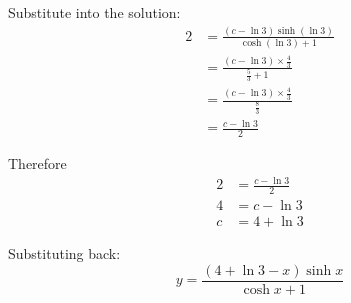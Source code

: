 \documentclass[leqno]{article}
\begin{document}
\begin{enumerate}[
  label=\textbf{\arabic*.},
  leftmargin=*,
  topsep=0pt,
  partopsep=0pt,
  parsep=0pt
]
\begin{djsSolution}
\begin{enumerate}[label=\textbf{(\alph*)}]
Substitute into the solution:
\begin{align*}
2
&=\frac{(c-\ln 3)\sinh(\ln 3)}{\cosh(\ln 3)+1} \\
&=\frac{(c-\ln 3)\times \frac43}{\frac53+1} \\
&=\frac{(c-\ln 3)\times \frac43}{\frac83} \\
&=\frac{c-\ln 3}{2}
\end{align*}

Therefore
\begin{align*}
2&=\frac{c-\ln 3}{2} \\
4&=c-\ln 3 \\
c&=4+\ln 3
\end{align*}

Substituting back:
\[
y=\frac{(4+\ln 3-x)\sinh x}{\cosh x+1}
\]
\end{enumerate}
\end{djsSolution}

\end{enumerate}
\end{document}
